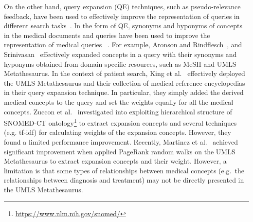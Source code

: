 \documentclass[1p]{elsarticle}
\begin{document}
On the other hand, query expansion (QE) techniques, such as pseudo-relevance feedback, have been used to effectively improve the representation of queries in different search tasks~\cite{aronson1997amia,srinivasan1996ipmb,amati2003thesis}. 
In the form of QE, synonyms and hyponyms of concepts in the medical documents and queries have been used to improve the representation of medical queries
~\cite{aronson1997amia,martinez2014,srinivasan1996ipmb,zuccon2012}. For example, Aronson and Rindflesch~\cite{aronson1997amia}, and Srinivasan~\cite{srinivasan1996ipmb} effectively expanded concepts in a query with their synonyms and hyponyms obtained from domain-specific resources, such as MeSH and UMLS Metathesaurus. In the context of patient search, King et al.~\cite{king2011trec} effectively deployed the UMLS Metathesaurus and their collection of medical reference encyclopedias in their query expansion technique. In particular, they simply added the derived medical concepts to the query and set the weights equally for all the medical concepts. Zuccon et al.~\cite{zuccon2012} investigated into exploiting hierarchical structure of SNOMED-CT ontology\footnote{\url{https://www.nlm.nih.gov/snomed/}} to extract expansion concepts and several techniques (e.g. tf-idf) for calculating weights of the expansion concepts. However, they found a limited performance improvement. Recently, Martinez et al.~\cite{martinez2014} achieved significant improvement when applied PageRank random walks on the UMLS Metathesaurus to extract expansion concepts and their weight. However, a limitation is that some types of relationships between medical concepts (e.g.\ the relationships between diagnosis and treatment) may not be directly presented in the UMLS Metathesaurus.
\end{document}
